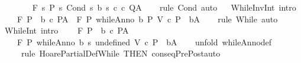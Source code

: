 \begin{isabellebody}
\ \ \ {\isasymLongrightarrow}\ \isanewline
\ \ \ {\isasymGamma}{\isacharcomma}{\isasymTheta}{\isasymturnstile}\isactrlbsub {\isacharslash}F\isactrlesub \ {\isacharbraceleft}s{\isachardot}\ P\ s{\isacharbraceright}\ {\isacharparenleft}Cond\ {\isacharbraceleft}s{\isachardot}\ b\ s{\isacharbraceright}\ c{}\ c{}{\isacharparenright}\ Q{\isacharcomma}A{\isachardoublequoteclose}\isanewline
%
\isadelimproof
\ \ %
\endisadelimproof
%
\isatagproof
{}\isamarkupfalse%
\ {\isacharparenleft}rule\ Cond{\isacharparenright}\ auto%
\endisatagproof
{\isafoldproof}%
%
\isadelimproof
\isanewline
%
\endisadelimproof
\ \isanewline
{}\isamarkupfalse%
\ WhileInvInt\ {\isacharbrackleft}intro{\isacharquery}{\isacharbrackright}{\isacharcolon}\isanewline
\ \ \ \ {\isachardoublequoteopen}{\isasymGamma}{\isacharcomma}{\isasymTheta}{\isasymturnstile}\isactrlbsub {\isacharslash}F\isactrlesub \ {\isacharparenleft}P\ {\isasyminter}\ b{\isacharparenright}\ c\ P{\isacharcomma}A\ {\isasymLongrightarrow}\ {\isasymGamma}{\isacharcomma}{\isasymTheta}{\isasymturnstile}\isactrlbsub {\isacharslash}F\isactrlesub \ P\ {\isacharparenleft}whileAnno\ b\ P\ V\ c{\isacharparenright}\ {\isacharparenleft}P\ {\isasyminter}\ {\isacharminus}b{\isacharparenright}{\isacharcomma}A{\isachardoublequoteclose}\isanewline
%
\isadelimproof
\ \ %
\endisadelimproof
%
\isatagproof
{}\isamarkupfalse%
\ {\isacharparenleft}rule\ While{\isacharparenright}\ auto%
\endisatagproof
{\isafoldproof}%
%
\isadelimproof
\isanewline
%
\endisadelimproof
\isanewline
{}\isamarkupfalse%
\ WhileInt\ {\isacharbrackleft}intro{\isacharquery}{\isacharbrackright}{\isacharcolon}\isanewline
\ \ \ \ {\isachardoublequoteopen}{\isasymGamma}{\isacharcomma}{\isasymTheta}{\isasymturnstile}\isactrlbsub {\isacharslash}F\isactrlesub \ {\isacharparenleft}P\ {\isasyminter}\ b{\isacharparenright}\ c\ P{\isacharcomma}A\ \isanewline
\ \ \ \ {\isasymLongrightarrow}\ \isanewline
\ \ \ \ {\isasymGamma}{\isacharcomma}{\isasymTheta}{\isasymturnstile}\isactrlbsub {\isacharslash}F\isactrlesub \ P\ {\isacharparenleft}whileAnno\ b\ {\isacharbraceleft}s{\isachardot}\ undefined{\isacharbraceright}\ V\ c{\isacharparenright}\ {\isacharparenleft}P\ {\isasyminter}\ {\isacharminus}b{\isacharparenright}{\isacharcomma}A{\isachardoublequoteclose}\isanewline
%
\isadelimproof
\ \ %
\endisadelimproof
%
\isatagproof
{}\isamarkupfalse%
\ {\isacharparenleft}unfold\ whileAnno{\isacharunderscore}def{\isacharparenright}\ \isanewline
\ \ \ \ \ {\isacharparenleft}rule\ HoarePartialDef{\isachardot}While\ {\isacharbrackleft}THEN\ conseqPrePost{\isacharbrackright}{\isacharcomma}auto{\isacharparenright}%

\end{isabellebody}
